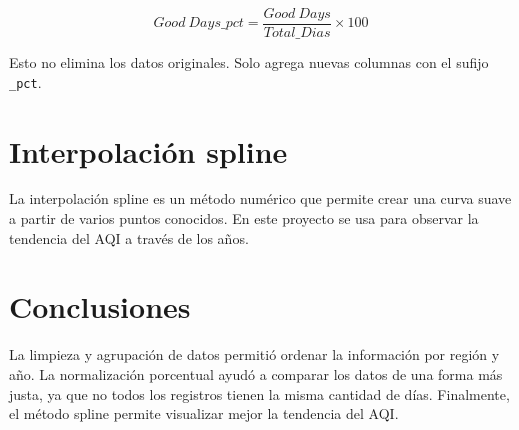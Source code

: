 \documentclass[12pt]{report}
\begin{document}
\[
Good\ Days\_pct = \frac{Good\ Days}{Total\_Dias} \times 100
\]

Esto no elimina los datos originales. Solo agrega nuevas columnas con el sufijo \texttt{\_pct}.

\section{Interpolación spline}

La interpolación spline es un método numérico que permite crear una curva suave a partir de varios puntos conocidos. En este proyecto se usa para observar la tendencia del AQI a través de los años.

\section{Conclusiones}

La limpieza y agrupación de datos permitió ordenar la información por región y año. La normalización porcentual ayudó a comparar los datos de una forma más justa, ya que no todos los registros tienen la misma cantidad de días. Finalmente, el método spline permite visualizar mejor la tendencia del AQI.


\renewcommand{\bibname}{\MakeUppercase{REFERENCIAS}}



\end{document}
